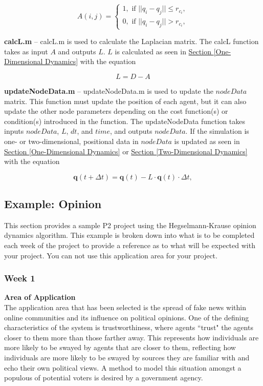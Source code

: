 \documentclass[../CourseManual.tex]{subfiles}
\begin{document}
$$
A(i,j) = 
\begin{cases}
1, \text{ if } ||{q}_i - {q}_j|| \leq r_{c_i}, \\
0, \text{ if } ||{q}_i - {q}_j|| > r_{c_i},
\end{cases}
$$

\textbf{calcL.m} -- calcL.m is used to calculate the Laplacian matrix. The calcL function takes as input $A$ and outputs $L$. $L$ is calculated as seen in \hyperref[One-Dimensional Dynamics]{Section \ref{One-Dimensional Dynamics}} with the equation 

$$L = D - A$$

\textbf{updateNodeData.m} -- updateNodeData.m is used to update the $nodeData$ matrix. This function must update the position of each agent, but it can also update the other node parameters depending on the cost function(s) or condition(s) introduced in the function. The updateNodeData function takes inputs $nodeData$, $L$, $dt$, and $time$, and outputs $nodeData$. If the simulation is one- or two-dimensional, positional data in $nodeData$ is updated as seen in \hyperref[One-Dimensional Dynamics]{Section \ref{One-Dimensional Dynamics}} or \hyperref[Two-Dimensional Dynamics]{Section \ref{Two-Dimensional Dynamics}} with the equation

$$
\boldsymbol{q}(t+\Delta t) = \boldsymbol{q}(t) - L \cdot \boldsymbol{q}(t) \cdot \Delta t,
$$

\subsection{Example: Opinion} \label{Example: Opinion}
This section provides a sample P2 project using the Hegselmann-Krause opinion dynamics algorithm. This example is broken down into what is to be completed each week of the project to provide a reference as to what will be expected with your project. You can not use this application area for your project.

\subsubsection{Week 1} \label{Week 1: Opinion}
\textbf{Area of Application}\\
The application area that has been selected is the spread of fake news within online communities and its influence on political opinions. One of the defining characteristics of the system is trustworthiness, where agents ``trust" the agents closer to them more than those farther away. This represents how individuals are more likely to be swayed by agents that are closer to them, reflecting how individuals are more likely to be swayed by sources they are familiar with and echo their own political views. A method to model this situation amongst a populous of potential voters is desired by a government agency.\\
\end{document}
